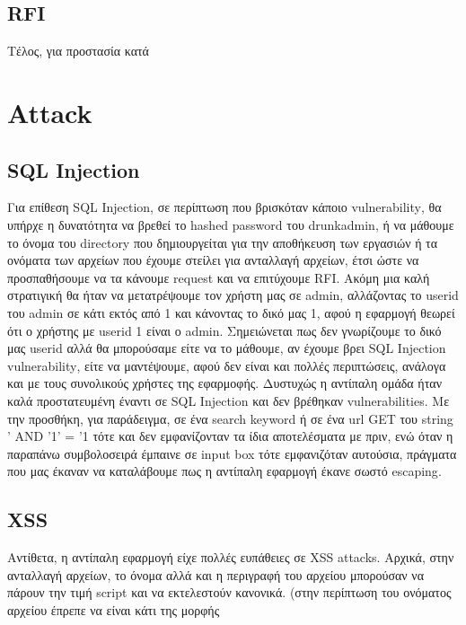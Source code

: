 \documentclass{article}
\begin{document}
\subsection*{\textlatin{RFI}}
Τέλος, για προστασία κατά








\section*{\textlatin{Attack}}








\subsection*{\textlatin{SQL Injection}}
Για επίθεση \textlatin{SQL Injection}, σε περίπτωση που βρισκόταν κάποιο \textlatin{vulnerability}, θα υπήρχε η δυνατότητα να βρεθεί το \textlatin{hashed password} του \textlatin{drunkadmin}, ή να μάθουμε το όνομα του \textlatin{directory} που δημιουργείται για την αποθήκευση των εργασιών ή τα ονόματα των αρχείων που έχουμε στείλει για ανταλλαγή αρχείων, έτσι ώστε να προσπαθήσουμε να τα κάνουμε \textlatin{request} και να επιτύχουμε \textlatin{RFI}. Ακόμη μια καλή στρατιγική θα ήταν να μετατρέψουμε τον χρήστη μας σε \textlatin{admin}, αλλάζοντας το \textlatin{userid} του \textlatin{admin} σε κάτι εκτός από 1 και κάνοντας το δικό μας 1, αφού η εφαρμογή θεωρεί ότι ο χρήστης με \textlatin{userid} 1 είναι ο \textlatin{admin}. Σημειώνεται πως δεν γνωρίζουμε το δικό μας \textlatin{userid} αλλά θα μπορούσαμε είτε να το μάθουμε, αν έχουμε βρει \textlatin{SQL Injection vulnerability}, είτε να μαντέψουμε, αφού δεν είναι και πολλές περιπτώσεις, ανάλογα και με τους συνολικούς χρήστες της εφαρμοφής. Δυστυχώς η αντίπαλη ομάδα ήταν καλά προστατευμένη έναντι σε \textlatin{SQL Injection} και δεν βρέθηκαν \textlatin{vulnerabilities}. Με την προσθήκη, για παράδειγμα, σε ένα \textlatin{search keyword} ή σε ένα \textlatin{url GET} του \textlatin{string ' AND '1' = '1} τότε και δεν εμφανίζονταν τα ίδια αποτελέσματα με πριν, ενώ όταν η παραπάνω συμβολοσειρά έμπαινε σε \textlatin{input box} τότε εμφανιζόταν αυτούσια, πράγματα που μας έκαναν να καταλάβουμε πως η αντίπαλη εφαρμογή έκανε σωστό \textlatin{escaping}. 





\subsection*{\textlatin{XSS}}
Αντίθετα, η αντίπαλη εφαρμογή είχε πολλές ευπάθειες σε \textlatin{XSS attacks}. Aρχικά, στην ανταλλαγή αρχείων, το όνομα αλλά και η περιγραφή του αρχείου μπορούσαν να πάρουν την τιμή \textlatin{script} και να εκτελεστούν κανονικά. (στην περίπτωση του ονόματος αρχείου έπρεπε να είναι κάτι της μορφής  
\end{document}
